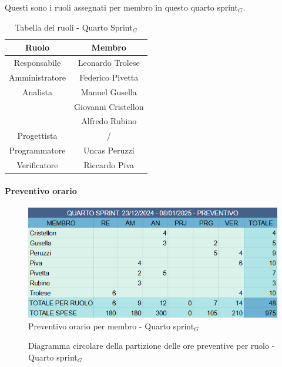 \documentclass[10pt]{article}
\begin{document}
{{{{{    Questi sono i ruoli assegnati per membro in questo quarto sprint$_G$.\\
    \begin{table}[H]
        \centering
        \begin{tabular}{|c|c|}
        \hline
        \rowcolor{gray!25}
        \textbf{Ruolo} & \textbf{Membro}\\
        \hline
        Responsabile & Leonardo Trolese\\
        \hline
        Amministratore & Federico Pivetta\\ 
        \hline
        Analista & Manuel Gusella\\
        & Giovanni Cristellon\\
        & Alfredo Rubino\\
        \hline
        Progettista & / \\
        \hline
        Programmatore & Uncas Peruzzi \\
        \hline
        Verificatore & Riccardo Piva\\
        \hline
        \end{tabular}
        \caption{Tabella dei ruoli - Quarto Sprint$_G$}
    \end{table}

    \paragraph{Preventivo orario}\mbox{}\vspace{0.4em}
    \begin{figure}[H]
    	\centering
    	\includegraphics[width=0.6\linewidth]{preventivoOreQuartoSprint.PNG}
    	\caption{Preventivo orario per membro - Quarto sprint$_G$}
    	\label{fig:Preventivo orario per membro - Quarto sprint$_G$}
    \end{figure}

    \begin{figure}[H]
        \centering
        \caption{Diagramma circolare della partizione delle ore preventive per ruolo - Quarto sprint$_G$ }
        \label{fig:Diagramma circolare della partizione delle ore preventive per ruolo - Quarto sprint$_G$}
    \end{figure}
    
}}}}}
\end{document}
